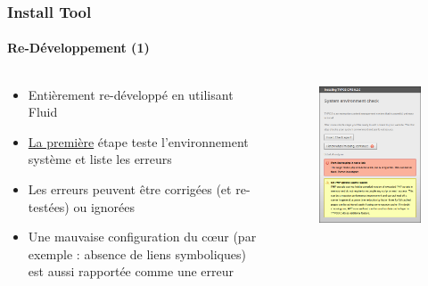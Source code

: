 \begin{frame}[fragile]
	\frametitle{Install Tool}
	\framesubtitle{Re-Développement (1)}

	\begin{columns}[T]

		\begin{column}{.5\textwidth}
			\begin{itemize}
				\item Entièrement re-développé en utilisant Fluid
				\item \underline{La première} étape teste l'environnement système et liste les erreurs
				\item Les erreurs peuvent être corrigées (et re-testées) ou ignorées
				\item Une mauvaise configuration du cœur (par exemple : absence de liens symboliques) est aussi rapportée comme une erreur
			\end{itemize}
		\end{column}

		\begin{column}{.5\textwidth}
			\begin{figure}\vspace*{-0.4cm}
				\includegraphics[width=0.8\linewidth]{Images/InstallTool/SystemEnvironmentCheck.png}
			\end{figure}
		\end{column}

	\end{columns}

\end{frame}

